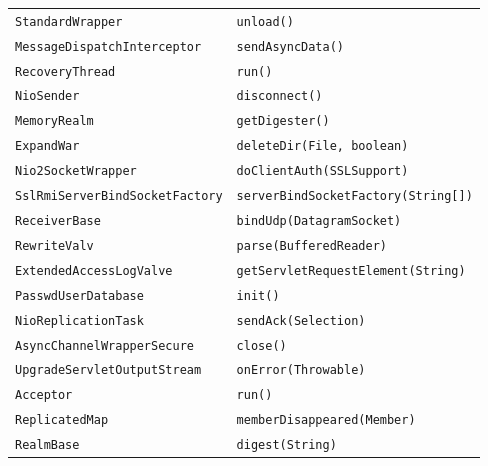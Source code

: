 \begin{center}
\begin{longtable}{ll}
\lstinline/StandardWrapper/&{\lstinline/unload()/}\\
\lstinline/MessageDispatchInterceptor/&{\lstinline/sendAsyncData()/}\\
\lstinline/RecoveryThread/&{\lstinline/run()/}\\
\lstinline/NioSender/&{\lstinline/disconnect()/}\\
\lstinline/MemoryRealm/&{\lstinline/getDigester()/}\\
\lstinline/ExpandWar/&{\lstinline/deleteDir(File, boolean)/}\\
\lstinline/Nio2SocketWrapper/&{\lstinline/doClientAuth(SSLSupport)/}\\
\lstinline/SslRmiServerBindSocketFactory/&{\lstinline/serverBindSocketFactory(String[])/}\\
\lstinline/ReceiverBase/&{\lstinline/bindUdp(DatagramSocket)/}\\
\lstinline/RewriteValv/&{\lstinline/parse(BufferedReader)/}\\
\lstinline/ExtendedAccessLogValve/&{\lstinline/getServletRequestElement(String)/}\\
\lstinline/PasswdUserDatabase/&{\hspace*{-2.5pt}\lstinline/init()/}\\
\lstinline/NioReplicationTask/&{\lstinline/sendAck(Selection)/}\\
\lstinline/AsyncChannelWrapperSecure/&{\lstinline/close()/}\\
\lstinline/UpgradeServletOutputStream/&{\lstinline/onError(Throwable)/}\\
\lstinline/Acceptor/&{\lstinline/run()/}\\
\lstinline/ReplicatedMap/&{\lstinline/memberDisappeared(Member)/}\\
\lstinline/RealmBase/&{\lstinline/digest(String)/}\\
\end{longtable}
\end{center}

